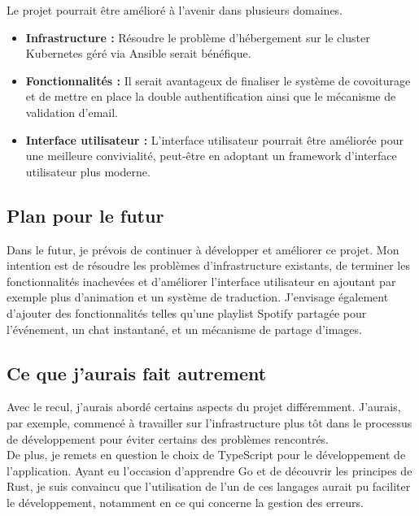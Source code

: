 Le projet pourrait être amélioré à l'avenir dans plusieurs domaines.\\

\begin{itemize}
    \item \textbf{Infrastructure :} Résoudre le problème d'hébergement sur le cluster Kubernetes géré via Ansible serait bénéfique.
    \item \textbf{Fonctionnalités :} Il serait avantageux de finaliser le système de covoiturage et de mettre en place la double authentification ainsi que le mécanisme de validation d'email.
    \item \textbf{Interface utilisateur :} L'interface utilisateur pourrait être améliorée pour une meilleure convivialité, peut-être en adoptant un framework d'interface utilisateur plus moderne.
\end{itemize}

\subsection{Plan pour le futur}\label{subsec:plan-futur}

Dans le futur, je prévois de continuer à développer et améliorer ce projet.
Mon intention est de résoudre les problèmes d'infrastructure existants, de terminer les fonctionnalités inachevées et d'améliorer l'interface utilisateur en ajoutant par exemple plus d'animation et un système de traduction.
J'envisage également d'ajouter des fonctionnalités telles qu'une playlist Spotify partagée pour l'événement, un chat instantané, et un mécanisme de partage d'images.

\subsection{Ce que j'aurais fait autrement}\label{subsec:ce-que-j-aurais-fait-autrement}

Avec le recul, j'aurais abordé certains aspects du projet différemment.
J'aurais, par exemple, commencé à travailler sur l'infrastructure plus tôt dans le processus de développement pour éviter certains des problèmes rencontrés.\\

De plus, je remets en question le choix de TypeScript pour le développement de l'application.
Ayant eu l'occasion d'apprendre Go et de découvrir les principes de Rust, je suis convaincu que l'utilisation de l'un de ces langages aurait pu faciliter le développement,
notamment en ce qui concerne la gestion des erreurs.\\

